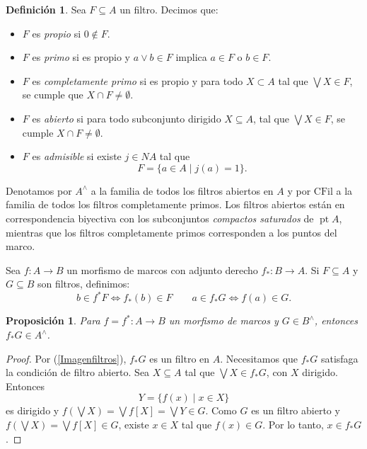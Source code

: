 \documentclass[11pt]{amsart}
\DeclareMathOperator{\pt}{pt}
\theoremstyle{plain}
\newtheorem{prop}[thm]{Proposición}
\theoremstyle{definition}
\newtheorem{dfn}[thm]{Definición}
\begin{document}
\begin{dfn}\label{tfiltros}
Sea $F\subseteq A$ un filtro. Decimos que:
\begin{itemize}
\item $F$ es \emph{propio} si $0\notin F$.
\item $F$ es \emph{primo} si es propio y $a\vee b\in F$ implica $a\in F$ o $b\in F$.
\item $F$ es \emph{completamente primo} si es propio y para todo $X\subset A$ tal que $\bigvee X\in F$, se cumple que $X\cap F\neq \emptyset$.
\item $F$ es \emph{abierto} si para todo subconjunto dirigido $X\subseteq A$, tal que $\bigvee X\in F$, se cumple $X\cap F\neq \emptyset$.
\item $F$ es \emph{admisible} si existe $j\in NA$ tal que 
\[
F=\{a\in A\mid j(a)=1\}.
\]
\end{itemize}
\end{dfn}

Denotamos por $A^\wedge$ a la familia de todos los filtros abiertos en $A$ y por $\text{CFil}$ a la familia de todos los filtros completamente primos. Los filtros abiertos están en correspondencia biyectiva con los subconjuntos 
\emph{compactos saturados} de $\pt A$, mientras que los filtros completamente primos corresponden a los puntos del marco.

Sea $f\colon A\to B$ un morfismo de marcos con adjunto derecho $f_*\colon B\to A$. Si $F\subseteq A$ y $G\subseteq B$ son filtros, definimos:
\begin{equation}\label{Imagenfiltros}
b\in f^*F \Longleftrightarrow f_*(b)\in F\qquad a\in f_*G \Longleftrightarrow f(a)\in G.
\end{equation}

\begin{prop}\label{fF}
Para $f=f^*\colon A\to B$ un morfismo de marcos y $G\in B^\wedge$, entonces $f_*G\in A^\wedge$.
\end{prop}

\begin{proof}
Por (\ref{Imagenfiltros}), $f_*G$ es un filtro en $A$. Necesitamos que $f_*G$ satisfaga la condición de filtro abierto. Sea $X\subseteq A$ tal que $\bigvee X\in f_*G$, con $X$ dirigido. Entonces
\[
Y=\{f(x)\mid x\in X\}
\] 
es dirigido y $f(\bigvee X)=\bigvee f[X]=\bigvee Y\in G$. Como $G$ es un filtro abierto y $f(\bigvee X)=\bigvee f[X]\in G$, existe $x\in X$ tal que $f(x)\in G$. Por lo tanto, $x\in f_*G$.
\end{proof}
\end{document}
